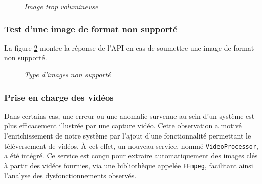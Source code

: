 \documentclass[12pt,a4paper]{report}
\begin{document}
	\begin{figure}[H]
		\centering
		\caption{\textit{Image trop volumineuse}}
		\label{fig:image-tros-grande}
	\end{figure}
	
	\subsubsection{Test d'une image de format non supporté}
	
	La figure \ref{fig:format-non-supporté} montre la réponse de l'API en cas de soumettre une image de format non supporté.
	
	\begin{figure}[H]
		\centering
		\caption{\textit{Type d'images non supporté}}
		\label{fig:format-non-supporté}
	\end{figure}
	
	\subsubsection{Prise en charge des vidéos}
	
	Dans certains cas, une erreur ou une anomalie survenue au sein d’un système est plus efficacement illustrée par une capture vidéo. Cette observation a motivé l’enrichissement de notre système par l’ajout d’une fonctionnalité permettant le téléversement de vidéos. À cet effet, un nouveau service, nommé \verb|VideoProcessor|, a été intégré. Ce service est conçu pour extraire automatiquement des images clés à partir des vidéos fournies, via une bibliothèque appelée \verb|FFmpeg|, facilitant ainsi l’analyse des dysfonctionnements observés.
	
\end{document}
